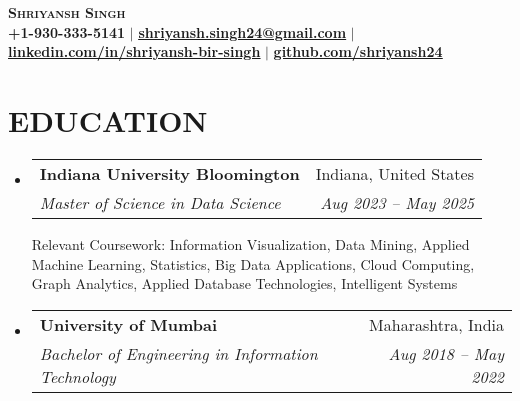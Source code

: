 \documentclass[letterpaper,11pt]{article}
\makeatletter
\newcommand{\resumeSubheading}[4]{
  \vspace{-2pt}\item
    \begin{tabular*}{0.97\textwidth}[t]{l@{\extracolsep{\fill}}r}
      \textbf{#1} & #2 \\
      \textit{\small#3} & \textit{\small #4} \\
    \end{tabular*}\vspace{-7pt}
}
\newcommand{\resumeSubHeadingListStart}{\begin{itemize}[leftmargin=0.15in, label={}]}
\newcommand{\resumeSubHeadingListEnd}{\end{itemize}}
\makeatother
\begin{document}

\begin{center}
    \textbf{\Huge \scshape Shriyansh Singh} \\ \vspace{1pt}
    \small \textbf{+1-930-333-5141}  $|$ \href{mailto:shriyansh.singh24@gmail.com}{\textbf{\underline{shriyansh.singh24@gmail.com}}} $|$ 
    \href{https://www.linkedin.com/in/shriyansh-bir-singh}{\textbf{\underline{linkedin.com/in/shriyansh-bir-singh}}} $|$
    \href{https://github.com/shriyansh24}{\textbf{\underline{github.com/shriyansh24}}}
\end{center}
\vspace{-25pt}

\section{\textbf{EDUCATION}}
  \resumeSubHeadingListStart
    \resumeSubheading
      {Indiana University Bloomington}{Indiana, United States}
      {Master of Science in Data Science}{Aug 2023 -- May 2025}
      \vspace{4pt}
      \small{Relevant Coursework: Information Visualization, Data Mining, Applied Machine Learning, Statistics, Big Data Applications, Cloud Computing, Graph Analytics, Applied Database Technologies, Intelligent Systems}
      \vspace{8pt}
    \resumeSubheading
      {University of Mumbai}{Maharashtra, India}
      {Bachelor of Engineering in Information Technology}{Aug 2018 -- May 2022}
  \resumeSubHeadingListEnd

\end{document}
